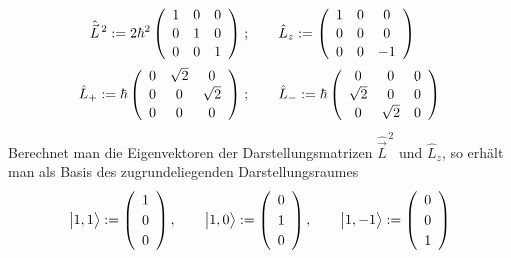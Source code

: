 \documentclass[9pt]{report}
\begin{document}
\begin{align}
\renewcommand{\arraystretch}{1.1}
\hat{\vec{L}}^{\,2}:=
2\hbar^{2}\left(\begin{array}{ccc}
1
&
0
&
0
\\
0
& 
1
& 
0
\\
0
& 
0
& 
1
\\\end{array}\right) &\;;\qquad
\renewcommand{\arraystretch}{1.1}
\hat{L}_{z}:=
\left(\begin{array}{ccc}
1
&
0
&
0
\\
0
& 
0
& 
0
\\
0
& 
0
& 
-1
\\\end{array}\right) \\
\renewcommand{\arraystretch}{1.1}
\hat{L}_{+}:=
\hbar\left(\begin{array}{ccc}
0
&
\sqrt{2}
&
0
\\
0
& 
0
& 
\sqrt{2}
\\
0
& 
0
& 
0
\\\end{array}\right) &\;;\qquad
\renewcommand{\arraystretch}{1.1}
\hat{L}_{-}:=
\hbar\left(\begin{array}{ccc}
0
&
0
&
0
\\
\sqrt{2}
& 
0
& 
0
\\
0
& 
\sqrt{2}
& 
0
\\\end{array}\right)
\end{align}
Berechnet man die Eigenvektoren der Darstellungsmatrizen $\hat{\vec{L}}^{\,2}$ und $\hat{L}_{z}$, so erhält man als Basis des zugrundeliegenden Darstellungsraumes
\begin{equation}
\big|1,1\big\rangle := 
\renewcommand{\arraystretch}{1.2}
\left(\begin{array}{c} 1 \\ 0 \\ 0 \\\end{array}\right),
\qquad
\big|1,0\big\rangle :=
\renewcommand{\arraystretch}{1.2}
\left(\begin{array}{c} 0 \\ 1 \\ 0 \\\end{array}\right),
\qquad
\big|1,-1\big\rangle :=
\renewcommand{\arraystretch}{1.2}
\left(\begin{array}{c} 0 \\ 0 \\ 1 \\\end{array}\right)
\end{equation}
\end{document}
